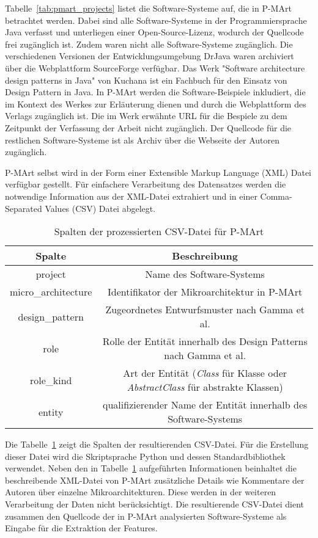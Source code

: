 Tabelle~\ref{tab:pmart_projects} listet die Software-Systeme auf, die in P-MArt betrachtet werden. Dabei sind alle Software-Systeme in der Programmiersprache Java verfasst und unterliegen einer Open-Source-Lizenz, wodurch der Quellcode frei zugänglich ist.
Zudem waren nicht alle Software-Systeme zugänglich. Die verschiedenen Versionen der Entwicklungsumgebung DrJava waren archiviert über die Webplattform SourceForge verfügbar. Das Werk "Software architecture design patterns in Java" von Kuchana ist ein Fachbuch für den Einsatz von Design Pattern in Java. 
In P-MArt werden die Software-Beispiele inkludiert, die im Kontext des Werkes zur Erläuterung dienen und durch die Webplattform des Verlags zugänglich ist. Die im Werk erwähnte URL für die Bespiele zu dem Zeitpunkt der Verfassung der Arbeit nicht zugänglich.
Der Quellcode für die restlichen Software-Systeme ist als Archiv über die Webseite der Autoren zugänglich.

P-MArt selbst wird in der Form einer Extensible Markup Language (XML) Datei verfügbar gestellt. Für einfachere Verarbeitung des Datensatzes werden die notwendige Information aus der XML-Datei extrahiert und in einer Comma-Separated Values (CSV) Datei abgelegt.

\begin{table}[H]
    \centering
    \begin{tabular}{|c|c|}
        \hline
        Spalte & Beschreibung\\
        \hline
        project & Name des Software-Systems\\
        micro\_architecture & Identifikator der Mikroarchitektur in P-MArt\\
        design\_pattern & Zugeordnetes Entwurfsmuster nach Gamma et al.\\
        role & Rolle der Entität innerhalb des Design Patterns nach Gamma et al.\\
        role\_kind & Art der Entität (\textit{Class} für Klasse oder \textit{AbstractClass} für abstrakte Klassen)\\
        entity & qualifizierender Name der Entität innerhalb des Software-Systems\\
        \hline
    \end{tabular}
    \caption{Spalten der prozessierten CSV-Datei für P-MArt}
    \label{tab:pmart_roles}
\end{table}

Die Tabelle~\ref{tab:pmart_roles} zeigt die Spalten der resultierenden CSV-Datei. Für die Erstellung dieser Datei wird die Skriptsprache Python und dessen Standardbibliothek verwendet.
Neben den in Tabelle~\ref{tab:pmart_roles} aufgeführten Informationen beinhaltet die beschreibende XML-Datei von P-MArt zusätzliche Details wie Kommentare der Autoren über einzelne Mikroarchitekturen.
Diese werden in der weiteren Verarbeitung der Daten nicht berücksichtigt. Die resultierende CSV-Datei dient zusammen den Quellcode der in P-MArt analysierten Software-Systeme als Eingabe für die Extraktion der Features.
